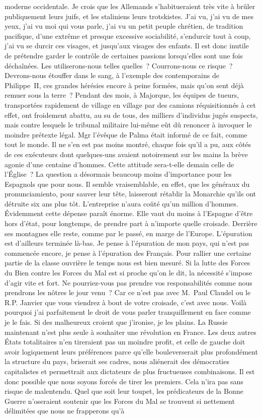 \documentclass[french,twoside]{book} %
\begin{document}
moderne occidentale. Je crois que les Allemands s’habitueraient très vite à brûler publiquement leurs juifs, et les staliniens leurs trotskistes. J’ai vu, j’ai vu de mes yeux, j’ai vu moi qui vous parle, j’ai vu un petit peuple chrétien, de tradition pacifique, d’une extrême et presque excessive sociabilité, s’endurcir tout à coup, j’ai vu se durcir ces visages, et jusqu’aux visages des enfants. Il est donc inutile de prétendre garder le contrôle de certaines passions lorsqu’elles sont une fois déchaînées. Les utiliserons-nous telles quelles ? Courrons-nous ce risque ? Devrons-nous étouffer dans le sang, à l’exemple des contemporains de Philippe \textsc{II}, ces grandes hérésies encore à peine formées, mais qu’on sent déjà remuer sous la terre ? Pendant des mois, à Majorque, les équipes de tueurs, transportées rapidement de village en village par des camions réquisitionnés à cet effet, ont froidement abattu, au su de tous, des milliers d’individus jugés suspects, mais contre lesquels le tribunal militaire lui-même eût dû renoncer à invoquer le moindre prétexte légal. Mgr l’évêque de Palma était informé de ce fait, comme tout le monde. Il ne s’en est pas moins montré, chaque fois qu’il a pu, aux côtés de ces exécuteurs dont quelques-uns avaient notoirement sur les mains la brève agonie d’une centaine d’hommes. Cette attitude sera-t-elle demain celle de l’Église ? La question a désormais beaucoup moins d’importance pour les Espagnols que pour nous. Il semble vraisemblable, en effet, que les généraux du pronunciamiento, pour sauver leur tête, laisseront rétablir la Monarchie qu’ils ont détruite six ans plus tôt. L’entreprise n’aura coûté qu’un million d’hommes. Évidemment cette dépense paraît énorme. Elle vaut du moins à l’Espagne d’être hors d’état, pour longtemps, de prendre part à n’importe quelle croisade. Derrière ses montagnes elle reste, comme par le passé, en marge de l’Europe. L’épuration est d’ailleurs terminée là-bas. Je pense à l’épuration de mon pays, qui n’est pas commencée encore, je pense à l’épuration des Français. Pour rallier une certaine partie de la classe ouvrière le temps nous est bien mesuré. Si la lutte des Forces du Bien contre les Forces du Mal est si proche qu’on le dit, la nécessité s’impose d’agir vite et fort. Ne pourriez-vous pas prendre vos responsabilités comme nous prendrons les nôtres le jour venu ? Car ce n’est pas avec M. Paul Claudel ou le R.P. Janvier que vous viendrez à bout de votre croisade, c’est avec nous. Voilà pourquoi j’ai parfaitement le droit de vous parler tranquillement en face comme je le fais. Si des malheureux croient que j’ironise, je les plains. La Russie maintenant n’est plus seule à souhaiter une révolution en France. Les deux autres États totalitaires n’en tireraient pas un moindre profit, et celle de gauche doit avoir logiquement leurs préférences parce qu’elle bouleverserait plus profondément la structure du pays, briserait ses cadres, nous aliénerait des démocraties capitalistes et permettrait aux dictateurs de plus fructueuses combinaisons. Il est donc possible que nous soyons forcés de tirer les premiers. Cela n’ira pas sans risque de malentendu. Quel que soit leur toupet, les prédicateurs de la Bonne Guerre n’oseraient soutenir que les Forces du Mal se trouvent si nettement délimitées que nous ne frapperons qu’à 
\end{document}
